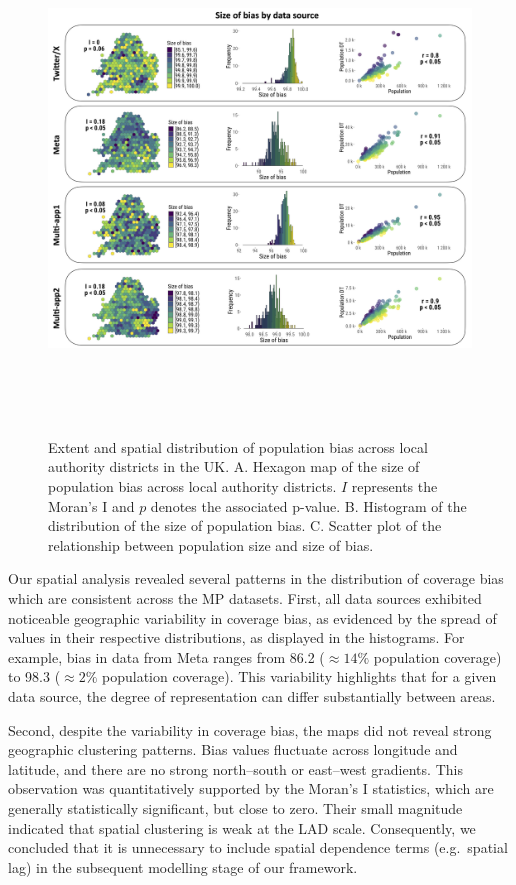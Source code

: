 \documentclass{article}
\begin{document}
\begin{figure}
\centering
\includegraphics[width=14.5cm,height=13.5cm]{figures/Fig-size-bias.png}
\caption{Extent and spatial distribution of population bias across local
authority districts in the UK. A. Hexagon map of the size of population
bias across local authority districts. \(I\) represents the Moran's I
and \(p\) denotes the associated p-value. B. Histogram of the
distribution of the size of population bias. C. Scatter plot of the
relationship between population size and size of
bias.}\label{fig:bias-size}
\end{figure}

Our spatial analysis revealed several patterns in the distribution of
coverage bias which are consistent across the MP
datasets. First, all data sources exhibited noticeable geographic
variability in coverage bias, as evidenced by the spread of values in
their respective distributions, as displayed in the histograms. For
example, bias in data from Meta ranges from 86.2 (\(\approx 14\%\)
population coverage) to 98.3 (\(\approx 2\%\) population coverage). This
variability highlights that for a given data source, the degree of
representation can differ substantially between areas.

Second, despite the variability in coverage bias, the maps did not
reveal strong geographic clustering patterns. Bias values fluctuate
across longitude and latitude, and there are no strong north--south or
east--west gradients. This observation was quantitatively supported by
the Moran's I statistics, which are generally statistically significant,
but close to zero. Their small magnitude indicated that spatial
clustering is weak at the LAD scale. Consequently, we concluded that it
is unnecessary to include spatial dependence terms (e.g.~spatial lag) in
the subsequent modelling stage of our framework.
\end{document}
